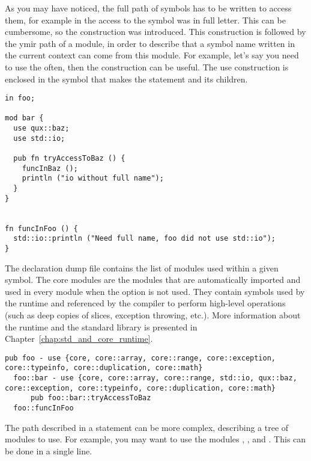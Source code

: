 As you may have noticed, the full path of symbols has to be written to access
them, for example in  the access to the symbol
 was in full letter. This can be cumbersome, so the
construction  was introduced. This construction is followed by the
ymir path of a module, in order to describe that a symbol name written in the
current context can come from this module. For example, let's say you need to
use the  often, then the  construction can
be useful. The use construction is enclosed in the symbol that makes the
statement and its children.

\begin{lstlisting}[caption=\textit{./foo.yr}, style=coloredverbatim]
in foo;

mod bar {
  use qux::baz;
  use std::io;

  pub fn tryAccessToBaz () {
    funcInBaz ();
    println ("io without full name");
  }
}


fn funcInFoo () {
  std::io::println ("Need full name, foo did not use std::io");
}
\end{lstlisting}

The declaration dump file  contains the list of
modules used within a given symbol. The core modules are the modules that are
automatically imported and used in every module when the 
option is not used. They contain symbols used by the runtime and referenced by
the compiler to perform high-level operations (such as deep copies of slices,
exception throwing, etc.). More information about the runtime and the standard
library is presented in Chapter~\ref{chap:std_and_core_runtime}.

\begin{lstlisting}[caption=\textit{foo.yr.ydump-decls.1}, style=intermediateVerb]
pub foo - use {core, core::array, core::range, core::exception, core::typeinfo, core::duplication, core::math}
  foo::bar - use {core, core::array, core::range, std::io, qux::baz, core::exception, core::typeinfo, core::duplication, core::math}
      pub foo::bar::tryAccessToBaz
  foo::funcInFoo
\end{lstlisting}

The path described in a  statement can be more complex, describing a
tree of modules to use. For example, you may want to use the modules
, , and . This can
be done in a single line.

